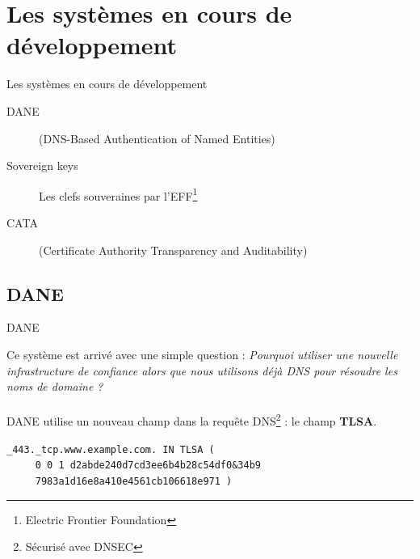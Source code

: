 \documentclass{bredelebeamer}
\begin{document}
\section{Les systèmes en cours de développement}

\begin{frame}{Les systèmes en cours de développement}

	\begin{description}
		\item [DANE] (DNS-Based Authentication of Named Entities)
		\item [Sovereign keys] Les clefs souveraines par l'EFF\footnote{Electric Frontier Foundation}
		\item [CATA] (Certificate Authority Transparency and Auditability)
	\end{description}

\end{frame}

\subsection{DANE}

\begin{frame}{DANE}

	Ce système est arrivé avec une simple question : \textit{Pourquoi utiliser une nouvelle infrastructure de confiance alors que nous utilisons déjà DNS pour résoudre les noms de domaine ?}\\
	\hfill\\
	DANE utilise un nouveau champ dans la requête DNS\footnote{Sécurisé avec DNSEC} : le champ \textbf{TLSA}.
\begin{center}
\texttt{\_443.\_tcp.www.example.com. IN TLSA (\\
	~~~~~0 0 1 d2abde240d7cd3ee6b4b28c54df0\&34b9\\
	~~~~~7983a1d16e8a410e4561cb106618e971 )}
\end{center}

\end{frame}
\end{document}

